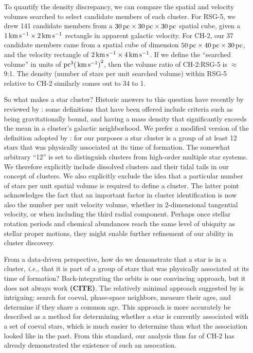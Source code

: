\documentclass[12pt,twocolumn,linenumbers]{aastex63}
\newcommand{\mkms}{{\rm \,km\,s^{-1}}}  %
\begin{document}
To quantify the density discrepancy, we can compare the spatial and
velocity volumes searched to select candidate members of each cluster.
For RSG-5, we drew 141 candidate members from a $30\,{\rm
pc}\times30\,{\rm pc}\times30\,{\rm pc}$ spatial cube, given a $1 {\rm \mkms} \times 2 {\rm \mkms }$ rectangle in apparent galactic velocity.
For CH-2, our 37 candidate members came from a spatial cube of
dimension $50\,{\rm pc}\times40\,{\rm pc}\times30\,{\rm pc}$, and the
velocity rectangle of $2 {\rm \mkms} \times 4 {\rm \mkms}$.  If we
define the ``searched volume'' in units of ${\rm pc}^3 {\rm
(\mkms)}^2$, then the volume ratio of CH-2:RSG-5 is $\approx$9:1.  The
density (number of stars per unit searched volume) within RSG-5 relative to
CH-2 similarly comes out to 34 to 1.

So what makes a star cluster?  Historic answers to this question have
recently by reviewed by \citet{krumholz_star_2019}: some definitions
that have been offered include criteria such as being gravitationally
bound, and having a mass density that significantly exceeds the mean
in a cluster's galactic neighborhood.  We prefer a modified version of
the definition adopted by \citet{krumholz_star_2019}: for our purposes
a star cluster is a group of at least 12 stars that was physically
associated at its time of formation.  The somewhat arbitrary ``12'' is
set to distinguish clusters from high-order multiple star systems.  We
therefore explicitly include dissolved clusters and their tidal tails
in our concept of clusters.  We also explicitly exclude the idea that
a particular number of stars per unit spatial volume is required to
define a cluster.  The latter point acknowledges the fact that an
important factor in cluster identification is now also the number per
unit velocity volume, whether in 2-dimensional tangential velocity, or
when including the third radial component.  Perhaps
once stellar rotation periods and chemical abundances reach the same
level of ubiquity as stellar proper motions, they might enable further
refinement of our ability in cluster discovery.

From a data-driven perspective, how do we demonstrate that a star is
in a cluster, {\it i.e.}, that it is part of a group of stars that was
physically associated at its time of formation?
Back-integrating the orbits is one convincing approach, but it does
not always work {\bf (CITE)}.
The relatively minimal approach suggested by \citet{tofflemire_2021}
is intriguing: search for coeval, phase-space neighbors, measure their
ages, and determine if they share a common age.
This approach is more accurately be described as a method for
determining whether a star is currently associated with a set of coeval
stars, which is much easier to determine than what the association
looked like in the past.
From this standard, our analysis thus far of CH-2 has already
demonstrated the existence of such an assocation.
\end{document}

